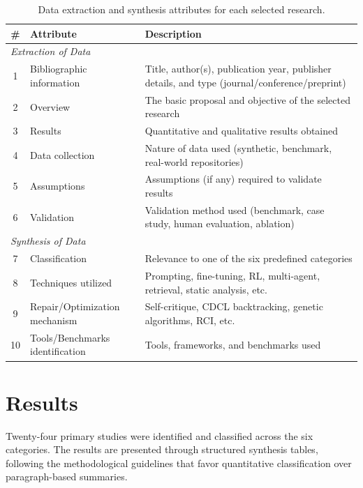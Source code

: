 \documentclass[11pt,a4paper]{article}
\begin{document}
\begin{table}[H]
\centering
\caption{Data extraction and synthesis attributes for each selected research.}
\label{tab:data_extraction}
\small
\begin{tabular}{@{}cp{4cm}p{9cm}@{}}
\toprule
\textbf{\#} & \textbf{Attribute} & \textbf{Description} \\
\midrule
\multicolumn{3}{l}{\textit{Extraction of Data}} \\
\midrule
1 & Bibliographic information & Title, author(s), publication year, publisher details, and type (journal/conference/preprint) \\
2 & Overview & The basic proposal and objective of the selected research \\
3 & Results & Quantitative and qualitative results obtained \\
4 & Data collection & Nature of data used (synthetic, benchmark, real-world repositories) \\
5 & Assumptions & Assumptions (if any) required to validate results \\
6 & Validation & Validation method used (benchmark, case study, human evaluation, ablation) \\
\midrule
\multicolumn{3}{l}{\textit{Synthesis of Data}} \\
\midrule
7 & Classification & Relevance to one of the six predefined categories \\
8 & Techniques utilized & Prompting, fine-tuning, RL, multi-agent, retrieval, static analysis, etc. \\
9 & Repair/Optimization mechanism & Self-critique, CDCL backtracking, genetic algorithms, RCI, etc. \\
10 & Tools/Benchmarks identification & Tools, frameworks, and benchmarks used \\
\bottomrule
\end{tabular}
\end{table}

\section{Results}
\label{sec:results}

Twenty-four primary studies were identified and classified across the six categories. The results are presented through structured synthesis tables, following the methodological guidelines that favor quantitative classification over paragraph-based summaries.
\end{document}
